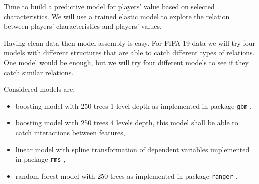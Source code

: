 \documentclass[]{krantz}
\providecommand{\tightlist}{%
  \setlength{\itemsep}{0pt}\setlength{\parskip}{0pt}}
\begin{document}
Time to build a predictive model for players' value based on selected characteristics. We will use a trained elastic model to explore the relation between players' characteristics and players' values.

Having clean data then model assembly is easy. For FIFA 19 data we will try four models with different structures that are able to catch different types of relations. One model would be enough, but we will try four different models to see if they catch similar relations.

Considered models are:

\begin{itemize}
\tightlist
\item
  boosting model with 250 trees 1 level depth as implemented in package \texttt{gbm} \citep{gbm},
\item
  boosting model with 250 trees 4 levels depth, this model shall be able to catch interactions between features,
\item
  linear model with spline transformation of dependent variables implemented in package \texttt{rms} \citep{rms},
\item
  random forest model with 250 trees as implemented in package \texttt{ranger} \citep{rangerRpackage}.
\end{itemize}
\end{document}
